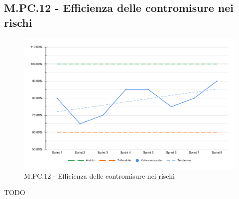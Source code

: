 \subsection{M.PC.12 - Efficienza delle contromisure nei rischi}
\begin{figure}[H]
    \centering
    \includegraphics[width=\textwidth]{assets/efficienza_contromisure.pdf}
    \caption{M.PC.12 - Efficienza delle contromisure nei rischi}
\end{figure}

\par TODO